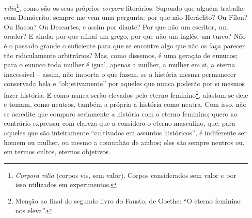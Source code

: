 \emph{vilia}\footnote{\emph{Corpora vilia} (corpos vis, sem valor).
  Corpos considerados sem valor e por isso utilizados em experimentos.},
como são os seus próprios \emph{corpora} literários. Supondo que alguém
trabalhe com Demócrito; sempre me vem uma pergunta: por que não
Heráclito? Ou Fílon? Ou Bacon? Ou Descartes, e assim por diante? Por que
não um escritor, um orador? E ainda: por que afinal um grego, por que
não um inglês, um turco? Não é o passado grande o suficiente para que se
encontre algo que não os faça parecer tão ridiculamente arbitrários?
Mas, como dissemos, é uma geração de eunucos; para o eunuco toda mulher
é igual, apenas a mulher, a mulher em si, a eterna inacessível -- assim,
não importa o que fazem, se a história mesma permanecer conservada bela
e ``objetivamente'' por aqueles que nunca poderão por si mesmos fazer
história. E como nunca serão elevados pelo eterno feminino\footnote{Menção
  ao final do segundo livro do Fausto, de Goethe: ``O eterno feminino
  nos eleva''.}, afastam-se dele e tomam, como neutros, também a própria
a história como neutra. Com isso, não se acredite que comparo seriamente
a história com o eterno feminino; quero ao contrário expressar com
clareza que a considero o eterno masculino, que, para aqueles que são
inteiramente ``cultivados em assuntos históricos'', é indiferente ser
homem ou mulher, ou mesmo a comunhão de ambos; eles são sempre neutros
ou, em termos cultos, eternos objetivos.

